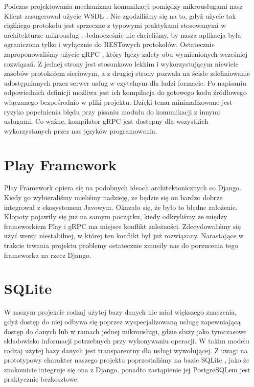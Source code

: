 \documentclass[licencjacka]{pracamgr}
\begin{document}
Podczas projektowania mechanizmu komunikacji pomiędzy mikrousługami nasz Klient
zasugerował użycie WSDL \cite{wsdl}. Nie zgodziliśmy się na to, gdyż użycie tak ciężkiego
protokołu jest sprzeczne z typowymi praktykami stosowanymi w architekturze
mikrousług \cite{mammatustech}. Jednocześnie nie chcieliśmy, by nasza aplikacja
była ograniczona tylko i wyłącznie do RESTowych protokołów. Ostatecznie
zaproponowaliśmy użycie gRPC \cite{grpc}, który łączy zalety obu wymienionych wcześniej
rozwiązań. Z jednej strony jest stosunkowo lekkim i wykorzystującym niewiele
zasobów protokołem sieciowym, a z drugiej strony pozwala na ścisłe zdefiniowanie
udostępnianych przez serwer usług w czytelnym dla ludzi formacie. Po napisaniu
odpowiednich definicji możliwa jest ich kompilacja do gotowego kodu źródłowego
włączanego bezpośrednio w pliki projektu. Dzięki temu minimalizowane jest ryzyko
popełnienia błędu przy pisaniu modułu do komunikacji z innymi usługami. Co ważne,
kompilator gRPC jest dostępny dla wszystkich wykorzystanych przez nas języków
programowania.

\section{Play Framework}

Play Framework \cite{play} opiera się na podobnych ideach architektonicznych co Django. Kiedy
go wybieraliśmy mieliśmy nadzieję, że będzie się on bardzo dobrze integrował z
ekosystemem Javowym. Okazało się, że było to błędne założenie. Kłopoty pojawiły
się już na samym początku, kiedy odkryliśmy że między frameworkiem Play i gRPC ma
miejsce konflikt zależności. Zdecydowaliśmy się użyć wersji niestabilnej, w
której ten konflikt był już rozwiązany. Narastające w trakcie trwania projektu
problemy ostatecznie zmusiły nas do porzucenia tego frameworka na rzecz Django.

\section{SQLite}

W naszym projekcie rodzaj użytej bazy danych nie miał większego znaczenia, gdyż
dostęp do niej odbywa się poprzez wyspecjalizowaną usługę zapewniającą dostęp do
danych lub w ramach jednej mikrousługi, gdzie służy jako tymczasowe składowisko
informacji potrzebnych przy wykonywaniu operacji. W takim modelu rodzaj użytej
bazy danych jest transparentny dla usługi wywołującej. Z uwagi na prototypowy
charakter naszego projektu poprzestaliśmy na bazie SQLite \cite{sqlite}, jako że znakomicie
integruje się ona z Django, ponadto zastąpienie jej PostgreSQLem \cite{postgres} jest
praktycznie bezkosztowe.
\end{document}
